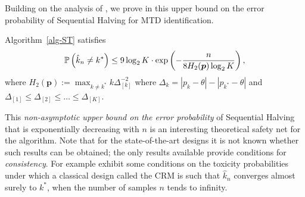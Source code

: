 Building on the analysis of \cite{Karnin13}, we prove in  this upper bound on the error probability of Sequential Halving for MTD identification.  

\begin{theorem}\label{thm:SH}
Algorithm~\ref{alg-ST} satisfies 
\begin{align*}
  \mathbb{P}\left(\hat{k}_n \neq k^*\right) \leq 9 \log_2 K \cdot \exp \left(
  - \frac{n}{8 H_2 (\bm p)\log_2 K}
  \right),
\end{align*}
where $H_2(\bm p):= \max_{k \ne k^*} {k}{\Delta_{[k]}^{-2}}$ where $\Delta_k = |p_k - \theta| - |p_{k^*} - \theta|$ and $\Delta_{[1]} \leq \Delta_{[2]} \leq \dots \leq \Delta_{[K]}$.
\end{theorem}

This \emph{non-asymptotic upper bound on the error probability} of Sequential Halving that is exponentially decreasing with $n$ is an interesting theoretical safety net for the algorithm. Note that for the state-of-the-art designs it is not known whether such results can be obtained; the only results available provide conditions for \emph{consistency}. For example \cite{ShenOQuigley96,CheungChappell02} exhibit some conditions on the toxicity probabilities under which a classical design called the CRM is such that $\hat{k}_n$ converges almost surely to $k^*$, when the number of samples $n$ tends to infinity. 



